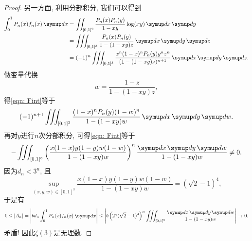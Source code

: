 \begin{proof}
    另一方面, 利用分部积分, 我们可以得到
    \begin{align}
        \int_0^1 P_n(x)f_n(x)\diff x
        &= \iint_{[0, 1]^2}\frac{P_n(x)P_n(y)}{1-xy}\log(xy)\diff x\diff y\label{eqn: Fint}\\
        &= \iiint_{[0, 1]^3}\frac{P_n(x)P_n(y)}{1-(1-xy)z}\diff x\diff y\diff z\\
        &= (-1)^n\iiint_{[0, 1]^3}\frac{x^n(1-x)^nP_n(y)y^nz^n}{(1-(1-xy)z)^{n+1}}\diff x\diff y\diff z.
    \end{align}
    做变量代换
    \begin{equation}
        w = \frac{1-z}{1-(1-xy)z},
    \end{equation}
    得\ref{eqn: Fint}等于
    \begin{equation}
        (-1)^{n+1}\iiint_{[0, 1]^3}\frac{(1-x)^nP_n(y)(1-w)^n}{1-(1-xy)w}\diff x\diff y\diff w.
    \end{equation}
    再对$y$进行$n$次分部积分, 可得\ref{eqn: Fint}等于
    \begin{equation}
        -\iiint_{[0, 1]^3}\lr(){\frac{x(1-x)y(1-y)w(1-w)}{1-(1-xy)w}}^n\frac{\diff x\diff y\diff w}{1-(1-xy)w}\neq 0.
    \end{equation}
    因为$d_n <3^n$, 且
    \begin{equation}
        \sup_{(x, y, w)\in [0, 1]^3}\frac{x(1-x)y(1-y)w(1-w)}{1-(1-xy)w} = (\sqrt{2}-1)^4,
    \end{equation}
    于是有
    \begin{equation}
        1\leq |A_n|=\lr\vert\vert{bd_n\int_0^1 P_n(x)f_n(x)\diff x}\leq\lr\vert\vert{b\lr(){27(\sqrt{2}-1)^4}^n\iiint_{[0, 1]^3}\frac{\diff x\diff y\diff w}{1-(1-xy)w}}\to 0,
    \end{equation}
    矛盾! 因此$\zeta(3)$是无理数.
\end{proof}


